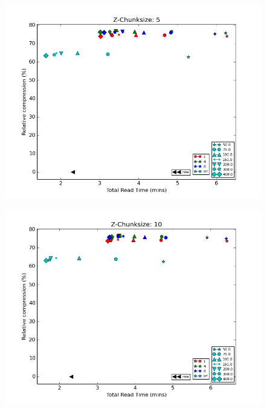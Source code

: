 \documentclass[a4paper]{article}
\begin{document}
      \begin{figure}[h!]
        \centering
        \includegraphics[scale=0.5]{Compression-ratio-vs-Read-time-z_chunk-5_raw.png}
      \end{figure}
    
      \begin{figure}[h!]
        \centering
        \includegraphics[scale=0.5]{Compression-ratio-vs-Read-time-z_chunk-10_raw.png}
      \end{figure}
    
\end{document}
